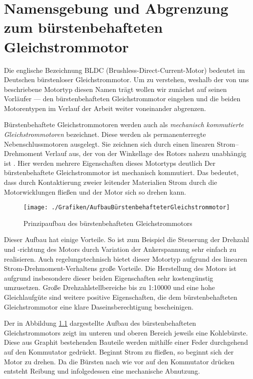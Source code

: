 \chapter{Namensgebung und Abgrenzung zum bürstenbehafteten Gleichstrommotor}

Die englische Bezeichnung \glqq{}BLDC\grqq{} (Brushless-Direct-Current-Motor) bedeutet im Deutschen \glqq{}bürstenloser Gleichstrommotor\grqq{}. Um zu verstehen, weshalb der von uns beschriebene Motortyp diesen Namen trägt wollen wir zunächst auf seinen Vorläufer --- den bürstenbehafteten Gleichstrommotor eingehen und die beiden Motorentypen im Verlauf der Arbeit weiter voneinander abgrenzen.

Bürstenbehaftete Gleichstrommotoren werden auch als \emph{mechanisch kommutierte Gleichstrommotoren} bezeichnet. Diese \glqq{}werden als permanenterregte Nebenschlussmotoren ausgelegt. Sie zeichnen sich durch einen linearen Strom–Drehmoment Verlauf aus, der von der Winkellage des Rotors nahezu unabhängig ist\grqq{} \parencite[S.51, Auslassung d. Autors]{Probst2011}. Hier werden mehrere Eigenschaften dieses Motortyps deutlich Der bürstenbehaftete Gleichstrommotor ist mechanisch kommutiert. Das bedeutet, dass durch Kontaktierung zweier leitender Materialien Strom durch die Motorwicklungen fließen und der Motor sich so drehen kann.

\begin{figure}[H]
  \centering
  \texttt{[image: ./Grafiken/AufbauBürstenbehafteterGleichstrommotor]}
  \caption[Aufbau bürstenbehafteter Gleichstrommotor]{Prinzipaufbau des bürstenbehafteten Gleichstrommotors \parencite[S.51]{Probst2011}}
  \label{fig:AufbauBürstenbehaftet}
\end{figure}

Dieser Aufbau hat einige Vorteile. So ist zum Beispiel die Steuerung der Drehzahl und -richtung des Motors durch Variation der Ankerspannung sehr einfach zu realisieren. Auch regelungstechnisch bietet dieser Motortyp aufgrund des linearen Strom-Drehmoment-Verhaltens große Vorteile. Die Herstellung des Motors ist aufgrund insbesondere dieser beiden Eigenschaften sehr kostengünstig umzusetzen. \glqq{}Große Drehzahlstellbereiche bis zu 1:10000 und eine hohe Gleichlaufgüte\grqq{} \parencite[S.51]{Probst2011} sind weitere positive Eigenschaften, die dem bürstenbehafteten Gleichstrommotor eine klare Daseinsberechtigung bescheinigen.

Der in Abbildung \ref{fig:AufbauBürstenbehaftet} dargestellte Aufbau des bürstenbehafteten Gleichstrommotors zeigt im unteren und oberen Bereich jeweils eine Kohlebürste. Diese aus Graphit bestehenden Bauteile werden mithilfe einer Feder durchgehend auf den Kommutator gedrückt. Beginnt Strom zu fließen, so beginnt sich der Motor zu drehen. Da die Bürsten nach wie vor auf den Kommutator drücken entsteht Reibung und infolgedessen eine mechanische Abnutzung.

